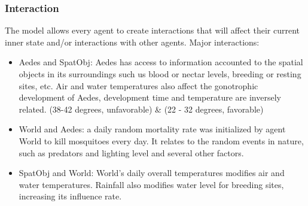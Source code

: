 \subsubsection{Interaction}

\indent The model allows every agent to create interactions that will affect their current inner state and/or interactions with other agents. Major interactions:
\begin{itemize}

	\item Aedes and SpatObj: Aedes has access to information accounted to the spatial objects in its surroundings such us blood or nectar levels, breeding or resting sites, etc. Air and water temperatures also affect the gonotrophic development of Aedes, development time and temperature are inversely related. (38-42 degrees, unfavorable) & (22 - 32 degrees, favorable)
		
	\item World and Aedes: a daily random mortality rate was initialized by agent World to kill mosquitoes every day. It relates to the random events in nature, such as predators and lighting level and several other factors. 
		
	\item SpatObj and World: World's daily overall     temperatures modifies air and water temperatures. Rainfall also modifies water level for breeding sites, increasing its influence rate.
\end{itemize}

